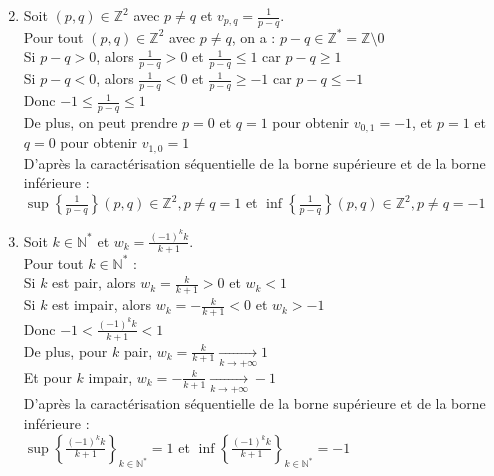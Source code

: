 \documentclass{report}
\begin{document}
\begin{enumerate}
    \setcounter{enumi}{1}
    \item Soit $(p,q) \in \mathbb{Z}^2$ avec $p \neq q$ et $v_{p,q} = \frac{1}{p-q}$. \\
    Pour tout $(p,q) \in \mathbb{Z}^2$ avec $p \neq q$, on a : $p-q \in \mathbb{Z}^* = \mathbb{Z} \setminus {0}$ \\
    Si $p-q > 0$, alors $\frac{1}{p-q} > 0$ et $\frac{1}{p-q} \leq 1$ car $p-q \geq 1$ \\
    Si $p-q < 0$, alors $\frac{1}{p-q} < 0$ et $\frac{1}{p-q} \geq -1$ car $p-q \leq -1$ \\
    Donc $-1 \leq \frac{1}{p-q} \leq 1$ \\
    De plus, on peut prendre $p=0$ et $q=1$ pour obtenir $v_{0,1} = -1$, et $p=1$ et $q=0$ pour obtenir $v_{1,0} = 1$ \\
    D'après la caractérisation séquentielle de la borne supérieure et de la borne inférieure : \\
    $\sup \left\{ \frac{1}{p-q} \right\}{(p,q)\in\mathbb{Z}^2, p\neq q} = 1$ et $\inf \left\{ \frac{1}{p-q} \right\}{(p,q)\in\mathbb{Z}^2, p\neq q} = -1$
    
    \item Soit $k \in \mathbb{N}^*$ et $w_k = \frac{(-1)^k k}{k+1}$. \\
    Pour tout $k \in \mathbb{N}^*$ : \\
    Si $k$ est pair, alors $w_k = \frac{k}{k+1} > 0$ et $w_k < 1$ \\
    Si $k$ est impair, alors $w_k = -\frac{k}{k+1} < 0$ et $w_k > -1$ \\
    Donc $-1 < \frac{(-1)^k k}{k+1} < 1$ \\
    De plus, pour $k$ pair, $w_k = \frac{k}{k+1} \underset{k \to +\infty}{\longrightarrow} 1$ \\
    Et pour $k$ impair, $w_k = -\frac{k}{k+1} \underset{k \to +\infty}{\longrightarrow} -1$ \\
    D'après la caractérisation séquentielle de la borne supérieure et de la borne inférieure : \\
    $\sup \left\{ \frac{(-1)^k k}{k+1} \right\}_{k\in\mathbb{N}^*} = 1$ et $\inf \left\{ \frac{(-1)^k k}{k+1} \right\}_{k\in\mathbb{N}^*} = -1$
\end{enumerate}
\end{document}
